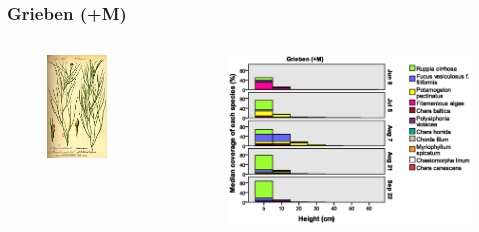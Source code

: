 \documentclass{beamer}
\begin{document}
\begin{frame}
\frametitle{Grieben (+M)}
\begin{columns}
\begin{column}{4.8cm}
\begin{figure}
\includegraphics[width=0.75\textwidth]{images/Fotos/ruppia.jpg}
\end{figure}
\end{column}
\begin{column}{8.0cm}
\begin{figure}
\includegraphics[width=\textwidth]{images/Wuchshoehenkartierung/Grieben+M1.eps}
\end{figure}
\end{column}
\end{columns}
\end{frame}
\end{document}
